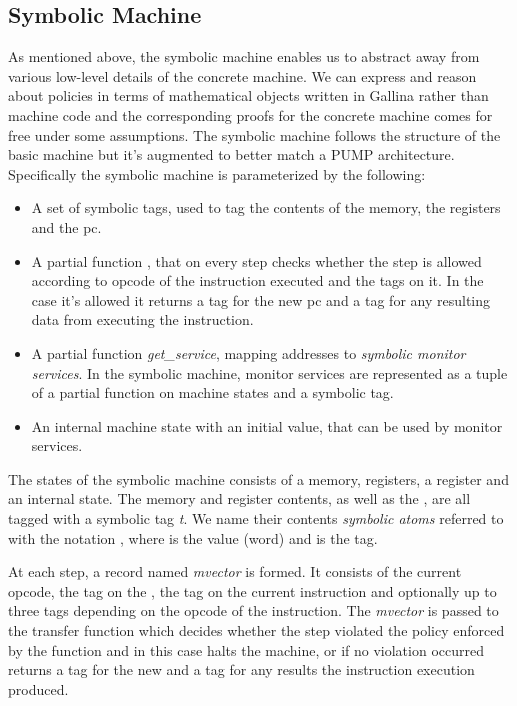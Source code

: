 
\subsection{Symbolic Machine}\label{sec:symbolic}

As mentioned above, the symbolic machine enables us to abstract away from 
various low-level details of the concrete machine. We can express and reason
about policies in terms of mathematical objects written in Gallina rather than
machine code and the corresponding proofs for the concrete machine comes for 
free under some assumptions. The symbolic machine follows the structure of the 
basic machine but it's augmented to better match a PUMP architecture. 
Specifically the symbolic machine is parameterized by the following:
\begin{itemize}
\item A set of symbolic tags, used to tag the contents of the memory, the
registers and the pc.
\item A partial function \TRANSFER, that on every step checks whether the
step is allowed according to opcode of the instruction executed and the tags on
it. In the case it's allowed it returns a tag for the new pc and a tag for any 
resulting data from executing the instruction.
\item A partial function \textit{get\_service}, mapping addresses to 
\textit{symbolic monitor services}. In the symbolic machine, monitor services
are represented as a tuple of a partial function on machine states and a
symbolic tag.
\item An internal machine state with an initial value, that can be used by 
monitor services.
\end{itemize}

The states of the symbolic machine consists of a memory, registers, a \pc 
register and an internal state.
The memory  and register contents, as well as the \pc, are all tagged with a
symbolic tag \textit{t}. We name their contents \textit{symbolic atoms} referred
to with the notation , where  is the value (word) and
 is the tag.

At each step, a record named \emph{mvector} is formed. It consists of the 
current opcode, the tag on the \pc, the tag on the current instruction and 
optionally up to three tags depending on the opcode of the instruction.
The \emph{mvector} is passed to the transfer function
which decides whether the step violated the policy enforced by the \TRANSFER
function and in this case halts the machine, or if no violation occurred returns
a tag for the new \pc and a tag for any results the instruction execution 
produced.

